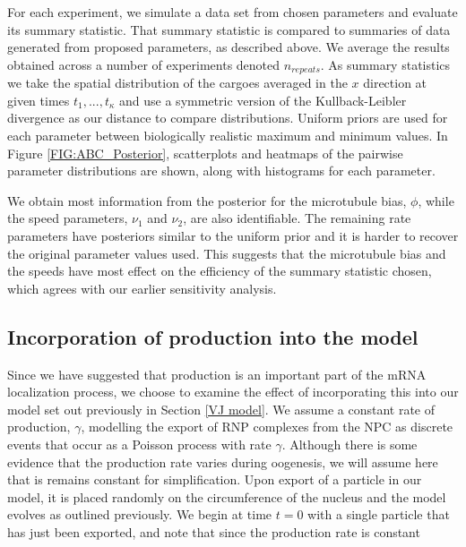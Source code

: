 \documentclass[twocolumn]{biophys}
\begin{document}
For each experiment, we simulate a data set from chosen parameters and evaluate its summary statistic. 
That summary statistic is compared to summaries of data generated from proposed parameters, as described above.
We average the results obtained across a number of experiments denoted $n_{repeats}$.
As summary statistics we take the spatial distribution of the cargoes averaged in the $x$ direction at given times $t_1,...,t_{\kappa}$ and use a symmetric version of the Kullback-Leibler divergence as our distance to compare distributions.
Uniform priors are used for each parameter between biologically realistic maximum and minimum values.
In Figure \ref{FIG:ABC_Posterior}, scatterplots and heatmaps of the pairwise parameter distributions are shown, along with histograms for each parameter. 

We obtain most information from the posterior for the microtubule bias, $\phi$, while the speed parameters, $\nu_1$ and $\nu_2$, are also identifiable. 
The remaining rate parameters have posteriors similar to the uniform prior and it is harder to recover the original parameter values used.
This suggests that the microtubule bias and the speeds have most effect on the efficiency of the summary statistic chosen, which agrees with our earlier sensitivity analysis.

\subsection{Incorporation of production into the model}

Since we have suggested that production is an important part of the mRNA localization process, we choose to examine the effect of incorporating this into our model set out previously in Section \ref{VJ model}.
We assume a constant rate of production, $\gamma$, modelling the export of RNP complexes from the NPC as discrete events that occur as a Poisson process with rate $\gamma$.
Although there is some evidence that the production rate varies during oogenesis, we will assume here that is remains constant for simplification.
Upon export of a particle in our model, it is placed randomly on the circumference of the nucleus and the model evolves as outlined previously.
We begin at time $t=0$ with a single particle that has just been exported, and note that since the production rate is constant 
\end{document}
